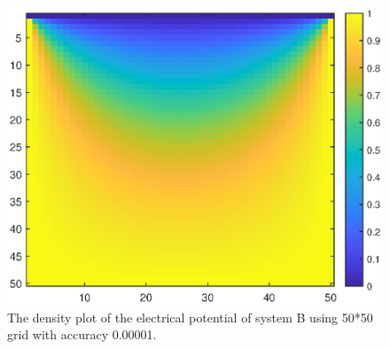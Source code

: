 \documentclass[12pt]{report}
\begin{document}
\begin{figure}[H]
    \centering
    \includegraphics[width=0.8\linewidth]{B000001Density.eps}
    \caption{The density plot of the electrical potential of system B using 50*50 grid with accuracy 0.00001.}
\end{figure}
\end{document}
